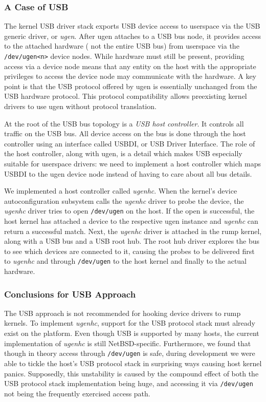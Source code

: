\subsubsection{A Case of USB}
\label{sect:usb}

The kernel USB driver stack exports USB device access to userspace
via the USB generic driver, or \textit{ugen}.  After ugen attaches
to a USB bus node, it provides access to the attached hardware (\ie
not the entire USB bus) from userspace via the \texttt{/dev/ugen<n>}
device nodes.  While hardware must still be present, providing
access via a device node means that any entity on the host with
the appropriate privileges to access the device node may communicate
with the hardware.  A key point is that the USB protocol offered
by ugen is essentially unchanged from the USB hardware protocol.
This protocol compatibility allows preexisting kernel drivers to use ugen
without protocol translation.

At the root of the USB bus topology is a \textit{USB host controller}.
It controls all traffic on the USB bus.  All device access on the bus
is done through the host controller using an interface called USBDI, or
USB Driver Interface.  The role of the host controller, along with ugen,
is a detail which makes USB especially suitable for userspace drivers:
we need to implement a host controller which maps USBDI to the ugen
device node instead of having to care about all bus details.

We implemented a host controller called \textit{ugenhc}.  When
the kernel's device autoconfiguration subsystem calls the \textit{ugenhc}
driver to probe the device, the \textit{ugenhc} driver tries to open
\texttt{/dev/ugen} on the host.  If the open is successful, the
host kernel has attached a device to the respective ugen instance
and \textit{ugenhc} can return a successful match.  Next, the \textit{ugenhc}
driver is attached in the rump kernel, along with a USB bus and a
USB root hub.  The root hub driver explores the bus to see which
devices are connected to it, causing the probes to be delivered
first to \textit{ugenhc} and through \texttt{/dev/ugen} to the host
kernel and finally to the actual hardware.

\subsubsection*{Conclusions for USB Approach}

The USB approach is not recommended for hooking device drivers to rump
kernels.  To implement \textit{ugenhc}, support for the USB protocol
stack must already exist on the platform.  Even though USB is supported
by many hosts, the current implementation of \textit{ugenhc} is still
NetBSD-specific.  Furthermore, we found that though in theory access
through \texttt{/dev/ugen} is safe, during development we were able to
tickle the host's USB protocol stack in surprising ways causing host
kernel panics.  Supposedly, this unstability is caused by the compound
effect of both the USB protocol stack implementation being huge, and
accessing it via \texttt{/dev/ugen} not being the frequently exercised
access path.


